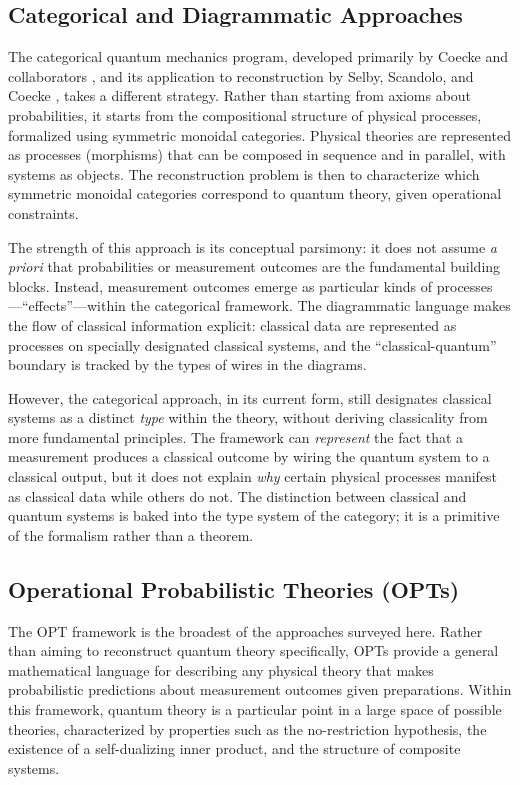\documentclass[pdflatex,sn-mathphys-num]{sn-jnl}%
\begin{document}
\subsection{Categorical and Diagrammatic Approaches}

The categorical quantum mechanics program, developed primarily by Coecke and collaborators \cite{Coecke2010}, and its application to reconstruction by Selby, Scandolo, and Coecke \cite{Selby2021}, takes a different strategy. Rather than starting from axioms about probabilities, it starts from the compositional structure of physical processes, formalized using symmetric monoidal categories. Physical theories are represented as processes (morphisms) that can be composed in sequence and in parallel, with systems as objects. The reconstruction problem is then to characterize which symmetric monoidal categories correspond to quantum theory, given operational constraints.

The strength of this approach is its conceptual parsimony: it does not assume \emph{a priori} that probabilities or measurement outcomes are the fundamental building blocks. Instead, measurement outcomes emerge as particular kinds of processes---``effects''---within the categorical framework. The diagrammatic language makes the flow of classical information explicit: classical data are represented as processes on specially designated classical systems, and the ``classical-quantum'' boundary is tracked by the types of wires in the diagrams.

However, the categorical approach, in its current form, still designates classical systems as a distinct \emph{type} within the theory, without deriving classicality from more fundamental principles. The framework can \emph{represent} the fact that a measurement produces a classical outcome by wiring the quantum system to a classical output, but it does not explain \emph{why} certain physical processes manifest as classical data while others do not. The distinction between classical and quantum systems is baked into the type system of the category; it is a primitive of the formalism rather than a theorem.

\subsection{Operational Probabilistic Theories (OPTs)}

The OPT framework \cite{Barrett2007,Barnum2007} is the broadest of the approaches surveyed here. Rather than aiming to reconstruct quantum theory specifically, OPTs provide a general mathematical language for describing any physical theory that makes probabilistic predictions about measurement outcomes given preparations. Within this framework, quantum theory is a particular point in a large space of possible theories, characterized by properties such as the no-restriction hypothesis, the existence of a self-dualizing inner product, and the structure of composite systems.
\end{document}
